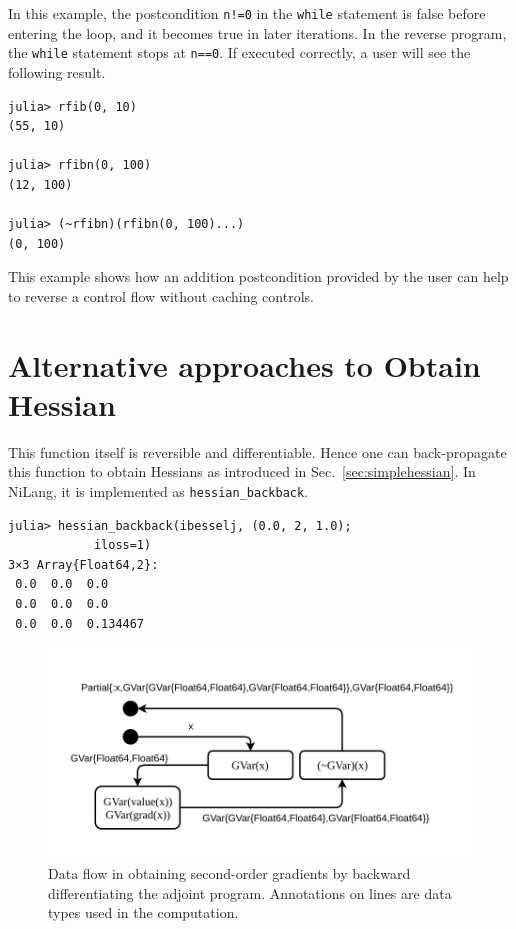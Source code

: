 \documentclass{article}
\newcommand{\<}{\langle}
\renewcommand{\>}{\rangle}
\newcommand{\Sec}[1]{Sec.~\ref{#1}}
\theoremstyle{definition}\newtheorem{definition}{\textit{Definition}}
\begin{document}
In this example, the postcondition \texttt{n!=0} in the \texttt{while} statement is false before entering the loop, and it becomes true in later iterations. In the reverse program, the \texttt{while} statement stops at \texttt{n==0}.
If executed correctly, a user will see the following result.

\begin{minipage}{.88\columnwidth}
\begin{lstlisting}
julia> rfib(0, 10)
(55, 10)

julia> rfibn(0, 100)
(12, 100)

julia> (~rfibn)(rfibn(0, 100)...)
(0, 100)
\end{lstlisting}
\end{minipage}

This example shows how an addition postcondition provided by the user can help to reverse a control flow without caching controls.

\section{Alternative approaches to Obtain Hessian}\label{app:hessian}
This function itself is reversible and differentiable. Hence one can back-propagate this function to obtain Hessians as introduced in \Sec{sec:simplehessian}. In NiLang, it is implemented as \texttt{hessian\_backback}.

\begin{minipage}{.88\columnwidth}
\begin{lstlisting}
julia> hessian_backback(ibesselj, (0.0, 2, 1.0);
            iloss=1)
3×3 Array{Float64,2}:
 0.0  0.0  0.0     
 0.0  0.0  0.0     
 0.0  0.0  0.134467
\end{lstlisting}
\end{minipage}

\begin{figure}[h]
    \centerline{\includegraphics[width=0.6\columnwidth,trim={0 1cm 0cm 1cm},clip]{simplehessian.pdf}}
    \caption{Data flow in obtaining second-order gradients by backward differentiating the adjoint program. Annotations on lines are data types used in the computation.}\label{fig:simplehessian}
\end{figure}
\end{document}
